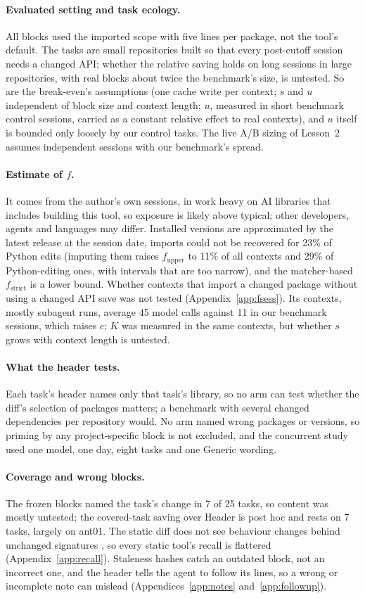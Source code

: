 \documentclass[11pt]{article}
\newcommand{\aHeader}{\textsf{Header}\xspace}
\newcommand{\aGen}{\textsf{Generic}\xspace}
\begin{document}
\paragraph{Evaluated setting and task ecology.} All blocks used the imported scope with five lines per package, not the tool's default. The tasks are small repositories built so that every post-cutoff session needs a changed API; whether the relative saving holds on long sessions in large repositories, with real blocks about twice the benchmark's size, is untested. So are the break-even's assumptions (one cache write per context; $s$ and $u$ independent of block size and context length; $u$, measured in short benchmark control sessions, carried as a constant relative effect to real contexts), and $u$ itself is bounded only loosely by our control tasks. The live A/B sizing of Lesson~2 assumes independent sessions with our benchmark's spread.
\paragraph{Estimate of $f$.} It comes from the author's own sessions, in work heavy on AI libraries that includes building this tool, so exposure is likely above typical; other developers, agents and languages may differ. Installed versions are approximated by the latest release at the session date, imports could not be recovered for 23\% of Python edits (imputing them raises $f_\text{upper}$ to 11\% of all contexts and 29\% of Python-editing ones, with intervals that are too narrow), and the matcher-based $f_\text{strict}$ is a lower bound. Whether contexts that import a changed package without using a changed API save was not tested (Appendix~\ref{app:fsess}). Its contexts, mostly subagent runs, average 45 model calls against 11 in our benchmark sessions, which raises $c$; $K$ was measured in the same contexts, but whether $s$ grows with context length is untested.
\paragraph{What the header tests.} Each task's header names only that task's library, so no arm can test whether the diff's selection of packages matters; a benchmark with several changed dependencies per repository would. No arm named wrong packages or versions, so priming by any project-specific block \citep{zhang2026guardrails} is not excluded, and the concurrent study used one model, one day, eight tasks and one \aGen wording.
\paragraph{Coverage and wrong blocks.} The frozen blocks named the task's change in 7 of 25 tasks, so content was mostly untested; the covered-task saving over \aHeader is post hoc and rests on 7 tasks, largely on ant01. The static diff does not see behaviour changes behind unchanged signatures \citep{chen2026whobrokeme}, so every static tool's recall is flattered (Appendix~\ref{app:recall}). Staleness hashes catch an outdated block, not an incorrect one, and the header tells the agent to follow its lines, so a wrong or incomplete note can mislead (Appendices~\ref{app:notes} and~\ref{app:followup}).
\end{document}
